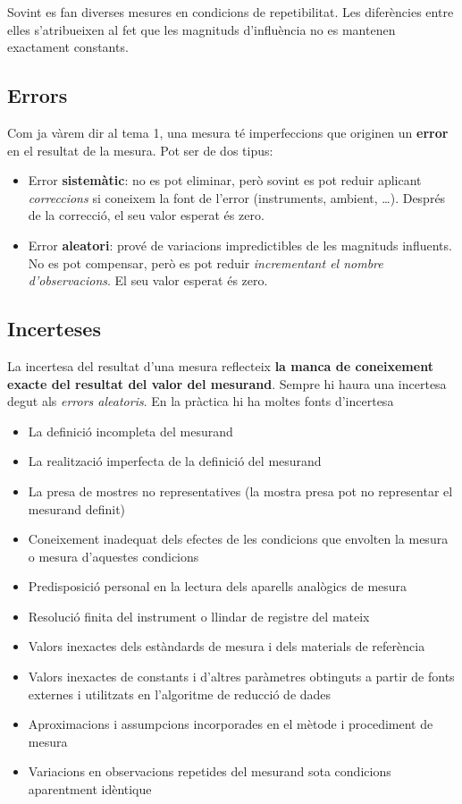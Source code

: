 \documentclass[12pt]{article}
\begin{document}
Sovint es fan diverses mesures en condicions de repetibilitat. Les diferències entre elles s’atribueixen al fet que les magnituds d’influència no es mantenen exactament constants.

\subsection{Errors}

Com ja vàrem dir al tema 1, una mesura té imperfeccions que originen un \textbf{error} en el resultat de la mesura. Pot ser de dos tipus:

\begin{itemize}
    \item Error \textbf{sistemàtic}: no es pot eliminar, però sovint es pot reduir aplicant \textit{correccions} si coneixem la font de l'error (instruments, ambient, \dots). Després de la correcció, el seu valor esperat és zero.
    \item Error \textbf{aleatori}: prové de variacions impredictibles de les magnituds influents. No es pot compensar, però es pot reduir \textit{incrementant el nombre d'observacions}. El seu valor esperat és zero.
\end{itemize}

\subsection{Incerteses}

La incertesa del resultat d'una mesura reflecteix \textbf{la manca de coneixement exacte del resultat del valor del mesurand}. Sempre hi haura una incertesa degut als \textit{errors aleatoris}. En la pràctica hi ha moltes fonts d'incertesa

\begin{itemize}
    \item La definició incompleta del mesurand
    \item La realització imperfecta de la definició del mesurand
    \item La presa de mostres no representatives (la mostra presa pot no representar el mesurand definit)
    \item Coneixement inadequat dels efectes de les condicions que envolten la mesura o mesura d’aquestes condicions
    \item Predisposició personal en la lectura dels aparells analògics de mesura
    \item Resolució finita del instrument o llindar de registre del mateix
    \item Valors inexactes dels estàndards de mesura i dels materials de referència
    \item Valors inexactes de constants i d’altres paràmetres obtinguts a partir de fonts externes i utilitzats en l’algoritme de reducció de dades
    \item Aproximacions i assumpcions incorporades en el mètode i procediment de mesura
    \item Variacions en observacions repetides del mesurand sota condicions aparentment idèntique
\end{itemize}
\end{document}
